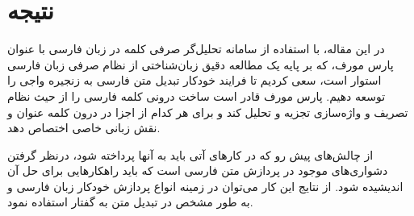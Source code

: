 \documentclass[12pt,onecolumn,a4paper]{article}
\begin{document}
    \section{نتیجه}
    در این مقاله، با استفاده از سامانه تحلیل‌گر صرفی کلمه در زبان فارسی با عنوان پارس مورف، که بر پایه یک مطالعه دقیق زبان‌شناختی از نظام صرفی زبان فارسی استوار است، سعی کردیم تا فرایند خودکار تبدیل متن فارسی به زنجیره واجی را توسعه دهیم. پارس مورف قادر است ساخت درونی کلمه فارسی را از حیث نظام تصریف و واژه‌سازی تجزیه و تحلیل کند و برای هر کدام از اجزا در درون کلمه عنوان و نقش زبانی خاصی اختصاص دهد.
    \par
    از چالش‌های پیش رو که در کارهای آتی باید به آنها پرداخته شود، درنظر گرفتن دشواری‌های موجود در پردازش متن فارسی {\mfo\citep{eslami_81}} است که باید راهکارهایی برای حل آن اندیشیده شود. از نتایج این کار می‌توان در زمینه انواع پردازش خودکار زبان فارسی و به طور مشخص در تبدیل متن به گفتار استفاده نمود.

    {\mfo
    
    }
\end{document}
